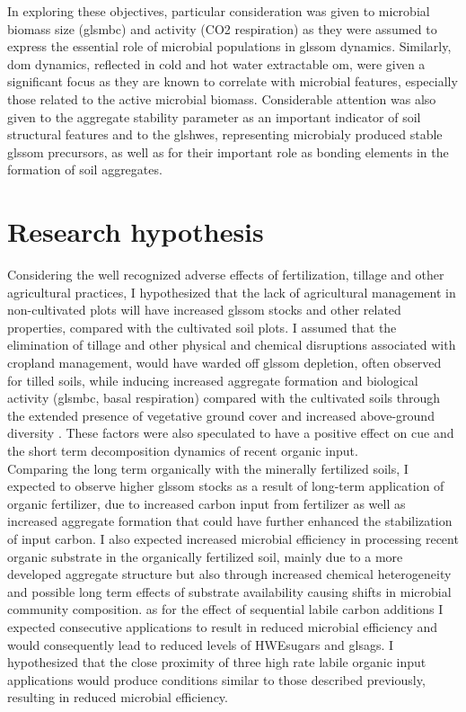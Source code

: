 	In exploring these objectives, particular consideration was given to microbial biomass size (gls{mbc})  and activity (CO2 respiration) as they were assumed to express the essential role of microbial populations in gls{som} dynamics. Similarly, \gls{dom} dynamics, reflected in cold and hot water extractable \gls{om}, were given a significant focus as they are known to correlate with microbial features, especially those related to the active microbial biomass.  Considerable attention was also given to the aggregate stability parameter as an important indicator of soil structural features and to the gls{hwes}, representing microbialy produced stable gls{som} precursors, as well as for their important role as bonding elements in the formation of soil aggregates.

\section{Research hypothesis}
	Considering the well recognized adverse effects of fertilization, tillage and other agricultural practices, I hypothesized that the lack of agricultural management in non-cultivated plots will have increased gls{som} stocks and other related properties, compared with the cultivated soil plots. I assumed that the elimination of tillage and other physical and chemical disruptions associated with cropland management, would have warded off gls{som} depletion, often observed for tilled soils, while inducing increased aggregate formation and biological activity (gls{mbc}, basal respiration)  compared with the cultivated soils through the extended presence of vegetative ground cover and increased above-ground diversity . These factors were also speculated to have a positive effect on \gls{cue} and the short term decomposition dynamics of recent organic input.\\
	Comparing the long term organically with the minerally fertilized soils, I expected to observe higher gls{som} stocks as a result of long-term application of organic fertilizer, due to increased carbon input from fertilizer as well as increased aggregate formation that could have further enhanced the stabilization of input carbon.  I also expected increased microbial efficiency in processing recent organic substrate in the organically fertilized soil, mainly due to a more developed aggregate structure but also through increased chemical heterogeneity and possible long term effects of substrate availability causing shifts in microbial community composition.
	as for the effect of sequential labile carbon additions I expected consecutive applications to result in reduced microbial efficiency and would consequently lead to reduced levels of HWEsugars and gls{ags}.  I hypothesized that the close proximity of three high rate labile organic input applications would produce conditions similar to those described previously, resulting in reduced microbial efficiency.
